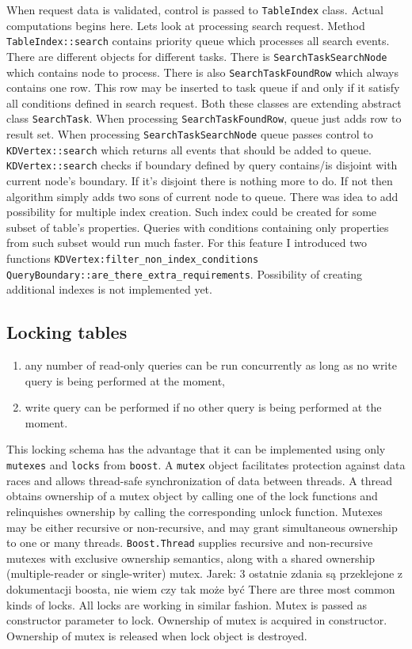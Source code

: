 \documentclass[10pt,a4paper]{article}
\newcommand{\jarek}[1]{\noindent\colorbox{myYellow}{Jarek: #1}}
\begin{document}
When request data is validated, control is passed to \verb|TableIndex| class. Actual computations begins here. Lets look at processing search request. Method \verb|TableIndex::search| contains priority queue which processes all search events. There are different objects for different tasks. There is \verb|SearchTaskSearchNode| which contains node to process. There is also \verb|SearchTaskFoundRow| which always contains one row. This row may be inserted to task queue if and only if it satisfy all conditions defined in search request. Both these classes are extending abstract class \verb|SearchTask|. When processing \verb|SearchTaskFoundRow|, queue just adds row to result set. When processing \verb|SearchTaskSearchNode| queue passes control to \verb|KDVertex::search| which returns all events that should be added to queue. \verb|KDVertex::search| checks if boundary defined by query contains/is disjoint with current node's boundary. If it's disjoint there is nothing more to do. If not then algorithm simply adds two sons of current node to queue. There was idea to add possibility for multiple index creation. Such index could be created for some subset of table's properties. Queries with conditions containing only properties from such subset would run much faster. For this feature I introduced two functions \verb|KDVertex:filter_non_index_conditions| \verb|QueryBoundary::are_there_extra_requirements|. Possibility of creating additional indexes is not implemented yet.  

\subsection{Locking tables}
\begin{enumerate}
\item any number of read-only queries can be run concurrently as long as no write query is being performed at the moment,
\item write query can be performed if no other query is being performed at the moment.
\end{enumerate}

This locking schema has the advantage that it can be implemented using only \verb|mutexes| and \verb|locks| from \verb|boost|. A \verb|mutex| object facilitates protection against data races and allows thread-safe synchronization of data between threads. A thread obtains ownership of a mutex object by calling one of the lock functions and relinquishes ownership by calling the corresponding unlock function. Mutexes may be either recursive or non-recursive, and may grant simultaneous ownership to one or many threads. \verb|Boost.Thread| supplies recursive and non-recursive mutexes with exclusive ownership semantics, along with a shared ownership (multiple-reader or single-writer) mutex. \jarek{3 ostatnie zdania są przeklejone z dokumentacji boosta, nie wiem czy tak może być}
There are three most common kinds of locks. All locks are working in similar fashion. Mutex is passed as constructor parameter to lock. Ownership of mutex is acquired in constructor. Ownership of mutex is released when lock object is destroyed.  
\end{document}
